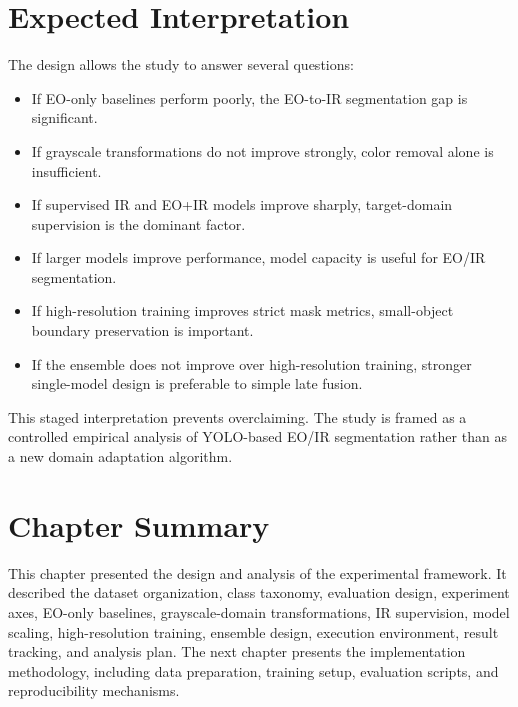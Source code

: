 \section{Expected Interpretation}

The design allows the study to answer several questions:

\begin{itemize}
    \item If EO-only baselines perform poorly, the EO-to-IR segmentation gap is significant.
    \item If grayscale transformations do not improve strongly, color removal alone is insufficient.
    \item If supervised IR and EO+IR models improve sharply, target-domain supervision is the dominant factor.
    \item If larger models improve performance, model capacity is useful for EO/IR segmentation.
    \item If high-resolution training improves strict mask metrics, small-object boundary preservation is important.
    \item If the ensemble does not improve over high-resolution training, stronger single-model design is preferable to simple late fusion.
\end{itemize}

This staged interpretation prevents overclaiming. The study is framed as a controlled empirical analysis of YOLO-based EO/IR segmentation rather than as a new domain adaptation algorithm.

\section{Chapter Summary}

This chapter presented the design and analysis of the experimental framework. It described the dataset organization, class taxonomy, evaluation design, experiment axes, EO-only baselines, grayscale-domain transformations, IR supervision, model scaling, high-resolution training, ensemble design, execution environment, result tracking, and analysis plan. The next chapter presents the implementation methodology, including data preparation, training setup, evaluation scripts, and reproducibility mechanisms.
